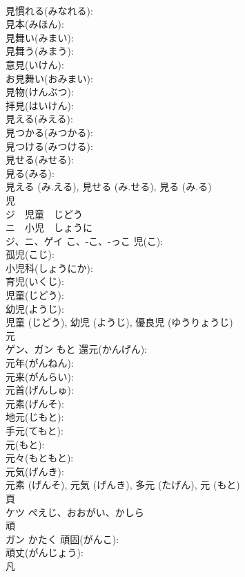 \documentclass[8pt]{extreport}
\begin{document}
\begin{CJK}{UTF8}{min}
\\	見慣れる(みなれる): 
\\	見本(みほん): 
\\	見舞い(みまい): 
\\	見舞う(みまう): 
\\	意見(いけん): 
\\	お見舞い(おみまい): 
\\	見物(けんぶつ): 
\\	拝見(はいけん): 
\\	見える(みえる): 
\\	見つかる(みつかる): 
\\	見つける(みつける): 
\\	見せる(みせる): 
\\	見る(みる): 
\\	見える (み.える), 見せる (み.せる), 見る (み.る)
\\	児			
\\	ジ　児童　じどう　
\\	ニ　小児　しょうに
\\	ジ、ニ、ゲイ	こ、-こ、-っこ	児(こ): 
\\	孤児(こじ): 
\\	小児科(しょうにか): 
\\	育児(いくじ): 
\\	児童(じどう): 
\\	幼児(ようじ): 
\\	児童 (じどう), 幼児 (ようじ), 優良児 (ゆうりょうじ)
\\	元			
\\	ゲン、ガン	もと	還元(かんげん): 
\\	元年(がんねん): 
\\	元来(がんらい): 
\\	元首(げんしゅ): 
\\	元素(げんそ): 
\\	地元(じもと): 
\\	手元(てもと): 
\\	元(もと): 
\\	元々(もともと): 
\\	元気(げんき): 
\\	元素 (げんそ), 元気 (げんき), 多元 (たげん), 元 (もと)
\\	頁			
\\	ケツ	ぺえじ、おおがい、かしら		
\\	頑			
\\	ガン	かたく	頑固(がんこ): 
\\	頑丈(がんじょう): 
\\	凡			

\end{CJK}
\end{document}
